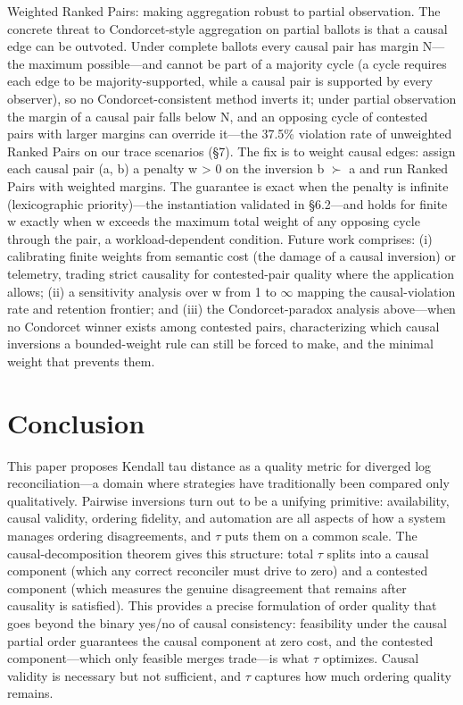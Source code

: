 \documentclass[11pt]{article}
\begin{document}
Weighted Ranked Pairs: making aggregation robust to partial observation. The concrete threat to Condorcet-style aggregation on partial ballots is that a causal edge can be outvoted. Under complete ballots every causal pair has margin N—the maximum possible—and cannot be part of a majority cycle (a cycle requires each edge to be majority-supported, while a causal pair is supported by every observer), so no Condorcet-consistent method inverts it; under partial observation the margin of a causal pair falls below N, and an opposing cycle of contested pairs with larger margins can override it—the 37.5\% violation rate of unweighted Ranked Pairs on our trace scenarios (§7). The fix is to weight causal edges: assign each causal pair (a, b) a penalty w > 0 on the inversion b $\succ $ a and run Ranked Pairs with weighted margins. The guarantee is exact when the penalty is infinite (lexicographic priority)—the instantiation validated in §6.2—and holds for finite w exactly when w exceeds the maximum total weight of any opposing cycle through the pair, a workload-dependent condition. Future work comprises: (i) calibrating finite weights from semantic cost (the damage of a causal inversion) or telemetry, trading strict causality for contested-pair quality where the application allows; (ii) a sensitivity analysis over w from 1 to $\infty $ mapping the causal-violation rate and retention frontier; and (iii) the Condorcet-paradox analysis above—when no Condorcet winner exists among contested pairs, characterizing which causal inversions a bounded-weight rule can still be forced to make, and the minimal weight that prevents them.

\section{Conclusion}
This paper proposes Kendall tau distance as a quality metric for diverged log reconciliation—a domain where strategies have traditionally been compared only qualitatively. Pairwise inversions turn out to be a unifying primitive: availability, causal validity, ordering fidelity, and automation are all aspects of how a system manages ordering disagreements, and $\tau $ puts them on a common scale. The causal-decomposition theorem gives this structure: total $\tau $ splits into a causal component (which any correct reconciler must drive to zero) and a contested component (which measures the genuine disagreement that remains after causality is satisfied). This provides a precise formulation of order quality that goes beyond the binary yes/no of causal consistency: feasibility under the causal partial order guarantees the causal component at zero cost, and the contested component—which only feasible merges trade—is what $\tau $ optimizes. Causal validity is necessary but not sufficient, and $\tau $ captures how much ordering quality remains.
\end{document}

